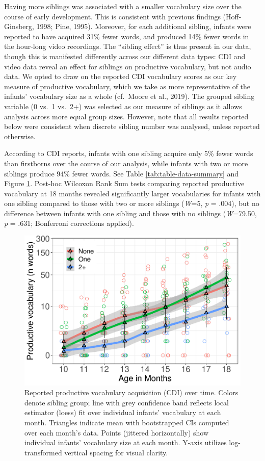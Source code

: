 \documentclass[
  english,
  man,floatsintext]{apa6}
\begin{document}
Having more siblings was associated with a smaller vocabulary size over the course of early development. This is consistent with previous findings (Hoff-Ginsberg, 1998; Pine, 1995). Moreover, for each additional sibling, infants were reported to have acquired 31\% fewer words, and produced 14\% fewer words in the hour-long video recordings. The \enquote{sibling effect} is thus present in our data, though this is manifested differently across our different data types: CDI and video data reveal an effect for siblings on productive vocabulary, but not audio data. We opted to draw on the reported CDI vocabulary scores as our key measure of productive vocabulary, which we take as more representative of the infants' vocabulary size as a whole (cf.~Moore et al., 2019). The grouped sibling variable (0 vs.~1 vs.~2+) was selected as our measure of siblings as it allows analysis across more equal group sizes. However, note that all results reported below were consistent when discrete sibling number was analysed, unless reported otherwise.

According to CDI reports, infants with one sibling acquire only 5\% fewer words than firstborns over the course of our analysis, while infants with two or more siblings produce 94\% fewer words. See Table \ref{tab:table-data-summary} and Figure \ref{fig:Figure-SibGroup}. Post-hoc Wilcoxon Rank Sum tests comparing reported productive vocabulary at 18 months revealed significantly larger vocabularies for infants with one sibling compared to those with two or more siblings (\emph{W}=5, \emph{p} = .004), but no difference between infants with one sibling and those with no siblings (\emph{W}=79.50, \emph{p} = .631; Bonferroni corrections applied).

\begin{figure}
\centering
\includegraphics{SiblingsStudyText_files/figure-latex/Figure-SibGroup-1.pdf}
\caption{\label{fig:Figure-SibGroup}Reported productive vocabulary acquisition (CDI) over time. Colors denote sibling group; line with grey confidence band reflects local estimator (loess) fit over individual infants' vocabulary at each month. Triangles indicate mean with bootstrapped CIs computed over each month's data. Points (jittered horizontally) show individual infants' vocabulary size at each month. Y-axis utilizes log-transformed vertical spacing for visual clarity.}
\end{figure}
\end{document}
